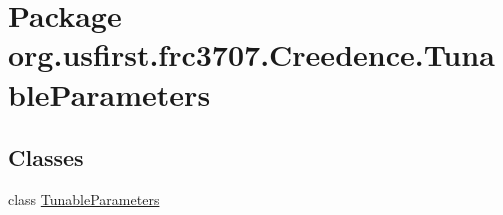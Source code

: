 \hypertarget{namespaceorg_1_1usfirst_1_1frc3707_1_1_creedence_1_1_tunable_parameters}{}\section{Package org.\+usfirst.\+frc3707.\+Creedence.\+Tunable\+Parameters}
\label{namespaceorg_1_1usfirst_1_1frc3707_1_1_creedence_1_1_tunable_parameters}
\subsection*{Classes}
\begin{DoxyCompactItemize}
\item 
class \mbox{\hyperlink{classorg_1_1usfirst_1_1frc3707_1_1_creedence_1_1_tunable_parameters_1_1_tunable_parameters}{Tunable\+Parameters}}
\end{DoxyCompactItemize}
